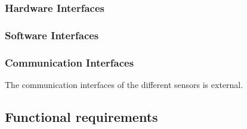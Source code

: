 \subsubsection{Hardware Interfaces}
\subsubsection{Software Interfaces}
\subsubsection{Communication Interfaces}
The communication interfaces of the different sensors is external.
\subsection{Functional requirements}
